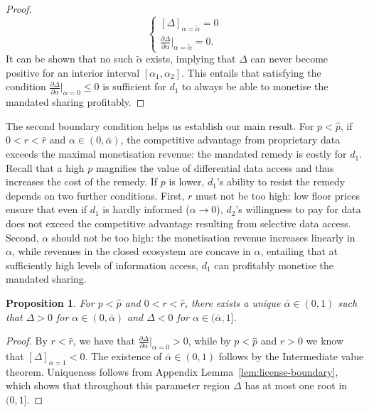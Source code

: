 \documentclass[11pt]{article}
\theoremstyle{plain}
\theoremstyle{definition}
\theoremstyle{plain}
\theoremstyle{plain}
\theoremstyle{plain}
\theoremstyle{plain}
\newtheorem{prop}[thm]{Proposition}
\numberwithin{equation}{section}
\begin{document}
\begin{proof}
\begin{equation*}
    \begin{cases}
        [\Delta]_{\alpha = \tilde{\alpha}}= 0\\[5pt]
        \frac{\partial \Delta}{\partial \alpha}\big|_{\alpha = \tilde{\alpha}}=0.
    \end{cases}
\end{equation*}
It can be shown that no such $\tilde{\alpha}$ exists, implying that $\Delta$ can never become positive for an interior interval $[\alpha_1,\alpha_2]$. This entails that satisfying the condition $\frac{\partial \Delta}{\partial \alpha} |_{\alpha = 0} \leq 0 $ is sufficient for $d_1$ to always be able to monetise the mandated sharing profitably.
\end{proof}
\vspace{2mm}

\noindent The second boundary condition helps us establish our main result. For $p < \hat{p}$, if $0 < r < \hat{r}$ and $\alpha \in (0, \bar{\alpha})$, the competitive advantage from proprietary data exceeds the maximal monetisation revenue: the mandated remedy is costly for $d_1$. Recall that a high $p$ magnifies the value of differential data access and thus increases the cost of the remedy. If $p$ is lower, $d_1$'s ability to resist the remedy depends on two further conditions. First, $r$ must not be too high: low floor prices ensure that even if $d_1$ is hardly informed ($\alpha \to 0$), $d_2$'s willingness to pay for data does not exceed the competitive advantage resulting from selective data access. Second, $\alpha$ should not be too high: the monetisation revenue increases linearly in $\alpha$, while revenues in the closed ecosystem are concave in $\alpha$, entailing that at sufficiently high levels of information access, $d_1$ can profitably monetise the mandated sharing.

\begin{prop}\label{license-gen}
    For $p < \hat{p}$ and $0 < r < \hat{r}$, there exists a unique $\bar{\alpha} \in (0,1)$ such that $\Delta >0$ for $\alpha \in (0,\bar{\alpha})$ and $\Delta <0$ for $\alpha \in (\bar{\alpha},1]$.
\end{prop}
\begin{proof}
    By $r < \hat{r}$, we have that  $\frac{\partial \Delta}{\partial \alpha} \big|_{\alpha = 0} > 0$, while by $p < \hat{p}$ and $r > 0$ we know that $[\Delta]_{\alpha = 1} < 0$. The existence of $\bar{\alpha} \in (0,1)$ follows by the Intermediate value theorem. Uniqueness follows from Appendix Lemma~\ref{lem:license-boundary}, which shows that throughout this parameter region $\Delta$ has at most one root in $(0,1]$.
\end{proof}
\vspace{2mm}
\end{document}
